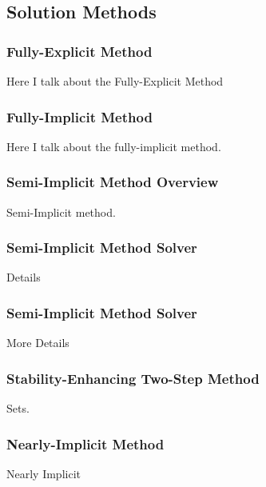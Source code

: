 \documentclass[compress]{beamer}
\begin{document}
\subsection[Solution Methods]{Solution Methods}
\begin{frame}
\frametitle{Fully-Explicit Method}

Here I talk about the Fully-Explicit Method

\end{frame}
\begin{frame}
\frametitle{Fully-Implicit Method}

Here I talk about the fully-implicit method.

\end{frame}
\begin{frame}
\frametitle{Semi-Implicit Method Overview}

Semi-Implicit method.

\end{frame}
\begin{frame}
\frametitle{Semi-Implicit Method Solver}

Details

\end{frame}
\begin{frame}
\frametitle{Semi-Implicit Method Solver}

More Details

\end{frame}
\begin{frame}
\frametitle{Stability-Enhancing Two-Step Method}

Sets.

\end{frame}
\begin{frame}
\frametitle{Nearly-Implicit Method}

Nearly Implicit

\end{frame}
\end{document}
